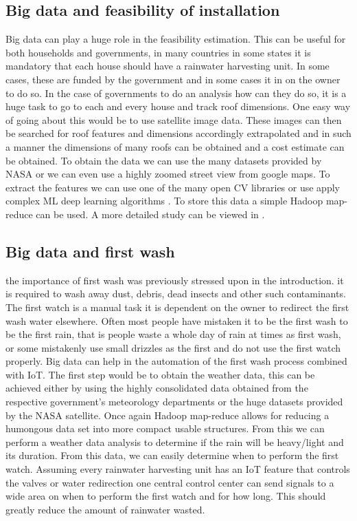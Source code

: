 \documentclass[sigconf]{acmart}
\begin{document}
\subsection{Big data and feasibility of installation}
Big data can play a huge role in the feasibility estimation. This can be useful for both households and governments, in many countries in some states it is mandatory that each house should have a rainwater harvesting unit. In some cases, these are funded by the government and in some cases it in on the owner to do so. In the case of governments to do an analysis how can they do so, it is a huge task to go to each and every house and track roof dimensions. One easy way of going about this would be to use satellite image data. These images can then be searched for roof features and dimensions accordingly extrapolated and in such a manner the dimensions of many roofs can be obtained and a cost estimate can be obtained. To obtain the data we can use the many datasets provided by NASA or we can even use a highly zoomed street view from google maps. To extract the features we can use one of the many open CV libraries or use apply complex ML deep learning algorithms . To store this data a simple Hadoop map-reduce can be used. A more detailed study can be viewed in \cite{RobertO.Ojwang2015}.

\subsection{Big data and first wash}
the importance of first wash was previously stressed upon in the introduction. it is required to wash away dust, debris, dead insects and other such contaminants. The first watch is a manual task it is dependent on the owner to redirect the first wash water elsewhere. Often most people have mistaken it to be the first wash to be the first rain, that is people waste a whole day of rain at times as first wash, or some mistakenly use small drizzles as the first and do not use the first watch properly. Big data can help in the automation of the first wash process combined with IoT. The first step would be to obtain the weather data, this can be achieved either by using the highly consolidated data obtained from the respective government's  meteorology departments or the huge datasets provided by the NASA satellite. Once again Hadoop map-reduce allows for reducing a humongous data set into more compact usable structures. From this we can perform a weather data analysis to determine if the rain will be heavy/light and its duration. From this data, we can easily determine when to perform the first watch. Assuming every rainwater harvesting unit has an IoT feature that controls the valves or water redirection one central control center can send signals to a wide area on when to perform the first watch and for how long. This should greatly reduce the amount of rainwater wasted.
\end{document}
